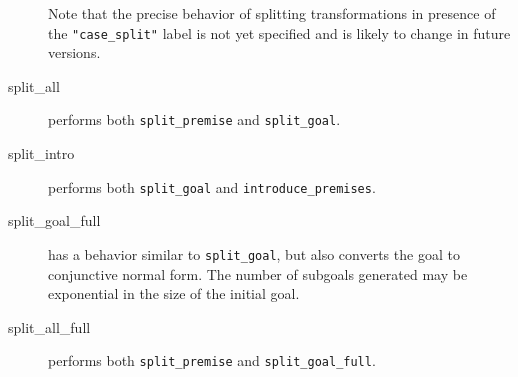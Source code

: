 \begin{description}
Note that the precise behavior of splitting transformations in presence of
the \verb|"case_split"| label is not yet specified
and is likely to change in future versions.


\item[split\_all]
  performs both \texttt{split\_premise} and \texttt{split\_goal}.

\item[split\_intro]
  performs both \texttt{split\_goal} and \texttt{introduce\_premises}.

\item[split\_goal\_full]
  has a behavior similar
  to \texttt{split\_goal}, but also converts the goal to conjunctive normal form.
  The number of subgoals generated may be exponential in the size of the initial goal.

\item[split\_all\_full]
  performs both \texttt{split\_premise} and \texttt{split\_goal\_full}.


\end{description}


